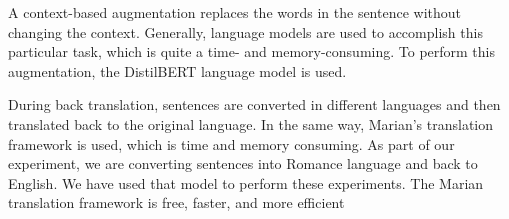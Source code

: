 \documentclass[%
	BCOR=8mm, %
	DIV=12,
	toc=bibliography, %
	toc=listof, %
	oneside, %
	egregdoesnotlikesansseriftitles, %
	]{scrbook}
\begin{document}
A context-based augmentation replaces the words in the sentence without changing the context. Generally, language models are used to accomplish this particular task, which is quite a time- and memory-consuming. To perform this augmentation, the DistilBERT language model is used.
\begin{table}[H]
    \centering
    \hspace*{-1.2em}
    \caption[Sample example of context-based augmentation]{ Sample example of context-based augmentation from IMDB dataset. }
    \label{table:conaugment}
\end{table}
During back translation, sentences are converted in different languages and then translated back to the original language. In the same way, Marian's translation framework \cite{ma_nlpaug_2022}  is used, which is time and memory consuming. As part of our experiment, we are converting sentences into Romance language and back to English. We have used that model to perform these experiments. The Marian translation framework  is free, faster, and more efficient
\end{document}
